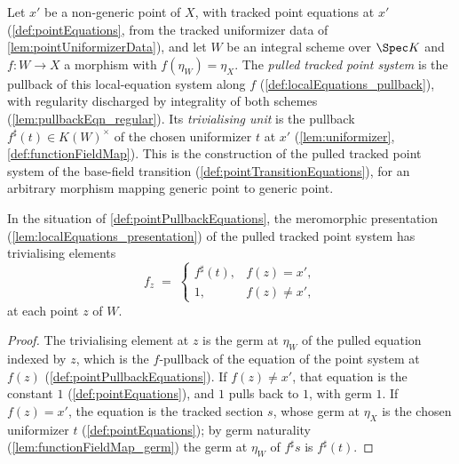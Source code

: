 \begin{definition}
  \label{def:pointPullbackEquations}
  \leanok
  Let \(x'\) be a non-generic point of \(X\), with tracked point equations at \(x'\)
  (\ref{def:pointEquations}, from the tracked uniformizer data of
  \ref{lem:pointUniformizerData}), and let \(W\) be an integral scheme over \(\Spec K\)
  and \(f : W \to X\) a morphism with \(f(\eta_W) = \eta_X\). The \emph{pulled tracked
  point system} is the pullback of this local-equation system along \(f\)
  (\ref{def:localEquations_pullback}), with regularity discharged by integrality of
  both schemes (\ref{lem:pullbackEqn_regular}). Its \emph{trivialising unit} is the
  pullback \(f^{\sharp}(t) \in K(W)^{\times}\) of the chosen uniformizer \(t\) at
  \(x'\) (\ref{lem:uniformizer}, \ref{def:functionFieldMap}). This is the construction
  of the pulled tracked point system of the base-field transition
  (\ref{def:pointTransitionEquations}), for an arbitrary morphism mapping generic
  point to generic point.
\end{definition}

\begin{lemma}
  \label{lem:pointPullbackEquations_elem}
  \leanok
  In the situation of \ref{def:pointPullbackEquations}, the meromorphic presentation
  (\ref{lem:localEquations_presentation}) of the pulled tracked point system has
  trivialising elements
  \[
    f_z \;=\;
    \begin{cases}
      f^{\sharp}(t), & f(z) = x', \\
      1, & f(z) \neq x',
    \end{cases}
  \]
  at each point \(z\) of \(W\).
\end{lemma}
\begin{proof}
  \leanok
  The trivialising element at \(z\) is the germ at \(\eta_W\) of the pulled equation
  indexed by \(z\), which is the \(f\)-pullback of the equation of the point system at
  \(f(z)\) (\ref{def:pointPullbackEquations}). If \(f(z) \neq x'\), that equation is
  the constant \(1\) (\ref{def:pointEquations}), and \(1\) pulls back to \(1\), with
  germ \(1\). If \(f(z) = x'\), the equation is the tracked section \(s\), whose germ
  at \(\eta_X\) is the chosen uniformizer \(t\) (\ref{def:pointEquations}); by germ
  naturality (\ref{lem:functionFieldMap_germ}) the germ at \(\eta_W\) of
  \(f^{\sharp}s\) is \(f^{\sharp}(t)\).
\end{proof}

